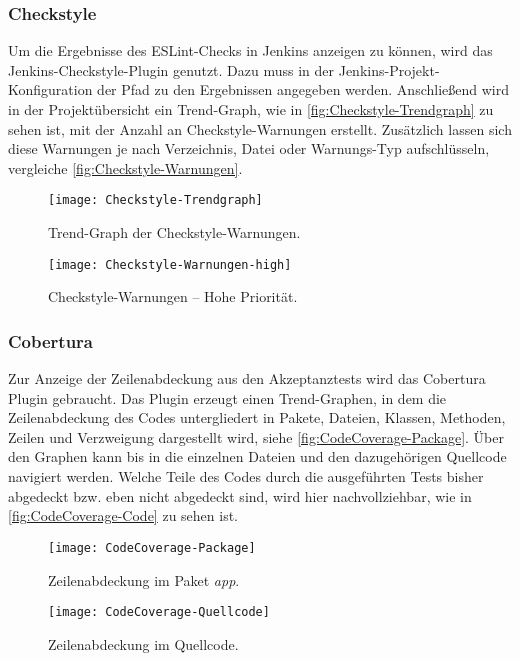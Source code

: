 \subsubsection{Checkstyle}
Um die Ergebnisse des ESLint-Checks in Jenkins anzeigen zu können, wird das Jenkins-Checkstyle-Plugin genutzt. Dazu muss in der Jenkins-Projekt-Konfiguration der Pfad zu den Ergebnissen angegeben werden. Anschließend wird in der Projektübersicht ein Trend-Graph, wie in \autoref{fig:Checkstyle-Trendgraph} zu sehen ist, mit der Anzahl an Checkstyle-Warnungen erstellt. Zusätzlich lassen sich diese Warnungen je nach Verzeichnis, Datei oder Warnungs-Typ aufschlüsseln, vergleiche \autoref{fig:Checkstyle-Warnungen}.

\begin{figure}[h]
\centering
\texttt{[image: Checkstyle-Trendgraph]} 
\caption[Checkstyle-Warnungen -- Trend-Graph]{Trend-Graph der Checkstyle-Warnungen.}
\label{fig:Checkstyle-Trendgraph}
\end{figure}

\begin{figure}[h]
\centering
\texttt{[image: Checkstyle-Warnungen-high]}
\caption[Checkstyle-Warnungen -- Hohe Priorität]{Checkstyle-Warnungen -- Hohe Priorität.}
\label{fig:Checkstyle-Warnungen}
\end{figure}

\subsubsection{Cobertura}
Zur Anzeige der Zeilenabdeckung aus den Akzeptanztests wird das Cobertura Plugin gebraucht. Das Plugin erzeugt einen Trend-Graphen, in dem die Zeilenabdeckung des Codes untergliedert in Pakete, Dateien, Klassen, Methoden, Zeilen und Verzweigung dargestellt wird, siehe \autoref{fig:CodeCoverage-Package}. Über den Graphen kann bis in die einzelnen Dateien und den dazugehörigen Quellcode navigiert werden. Welche Teile des Codes durch die ausgeführten Tests bisher abgedeckt bzw. eben nicht abgedeckt sind, wird hier nachvollziehbar, wie in \autoref{fig:CodeCoverage-Code} zu sehen ist.

\begin{figure}[h]
\centering
\texttt{[image: CodeCoverage-Package]}
\caption[Zeilenabdeckung im Paket \emph{app}]{Zeilenabdeckung im Paket \emph{app}.}
\label{fig:CodeCoverage-Package}
\end{figure}

\begin{figure}[h]
\centering
\texttt{[image: CodeCoverage-Quellcode]}
\caption[Zeilenabdeckung im Quellcode]{Zeilenabdeckung im Quellcode.}
\label{fig:CodeCoverage-Code}
\end{figure}

